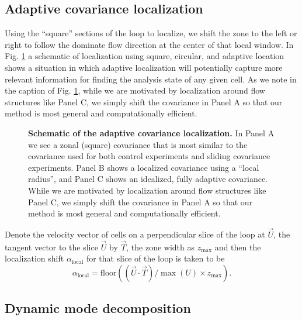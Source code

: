 \documentclass[10pt,letterpaper]{article}
\begin{document}
\subsection*{Adaptive covariance localization}

Using the ``square'' sections of the loop to localize, we shift the zone to the left or right to follow the dominate flow direction at the center of that local window.
In Fig. \ref{fig:covariance-localization-schematic} a schematic of localization using square, circular, and adaptive location shows a situation in which adaptive localization will potentially capture more relevant information for finding the analysis state of any given cell.
As we note in the caption of Fig. \ref{fig:covariance-localization-schematic}, while we are motivated by localization around flow structures like Panel C, we simply shift the covariance in Panel A so that our method is most general and computationally efficient.

\begin{figure}[h]
  \centering
  \caption[]{
\textbf{    Schematic of the adaptive covariance localization.
}    In Panel A we see a zonal (square) covariance that is most similar to the covariance used for both control experiments and sliding covariance experiments.
    Panel B shows a localized covariance using a ``local radius'', and Panel C shows an idealized, fully adaptive covariance.
    While we are motivated by localization around flow structures like Panel C, we simply shift the covariance in Panel A so that our method is most general and computationally efficient.
  }
  \label{fig:covariance-localization-schematic}
\end{figure}

Denote the velocity vector of cells on a perpendicular slice of the loop at $\vec{U}$, the tangent vector to the slice $\vec{U}$ by $\vec{T}$, the zone width as $z_{\text{max}}$ and then the localization shift $\alpha_{\text{local}}$ for that slice of the loop is taken to be
\begin{equation} \alpha_{\text{local}} = \text{floor} \left( (\vec{U} \cdot \vec{T})/\max (U) \times z_{\text{max}} \right) . \end{equation}

\subsection*{Dynamic mode decomposition}
\end{document}
